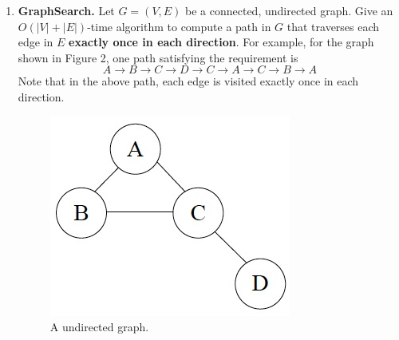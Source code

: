 \documentclass[12pt,a4paper]{article}
\makeatletter
\newtheorem*{solution}{Solution}
\theoremstyle{definition}
\renewenvironment{solution}[1][Solution] {\par\pushQED{\qed}\normalfont\topsep6\p@\@plus6\p@\relax\trivlist\item[\hskip\labelsep\bfseries#1\@addpunct{.}]\ignorespaces}{\popQED\endtrivlist\@endpefalse} \makeatother
\makeatother
\begin{document}
\begin{enumerate}

\item \textbf{GraphSearch.} Let $G=(V,E)$ be a connected, undirected graph. Give an $O(|V|+|E|)$-time algorithm to compute a path in $G$ that traverses each edge in $E$ \textbf{exactly once in each direction}. For example, for the graph shown in Figure 2, one path satisfying the requirement is
$$A \rightarrow B \rightarrow C \rightarrow D \rightarrow C \rightarrow A \rightarrow C \rightarrow B \rightarrow A$$
Note that in the above path, each edge is visited exactly once in each direction.

\begin{figure}[h]
 \centering
 \includegraphics[scale=0.35]{Lab08-figure2.jpg}
 \caption{A undirected graph.}
\end{figure}


\end{enumerate}

\end{document}
